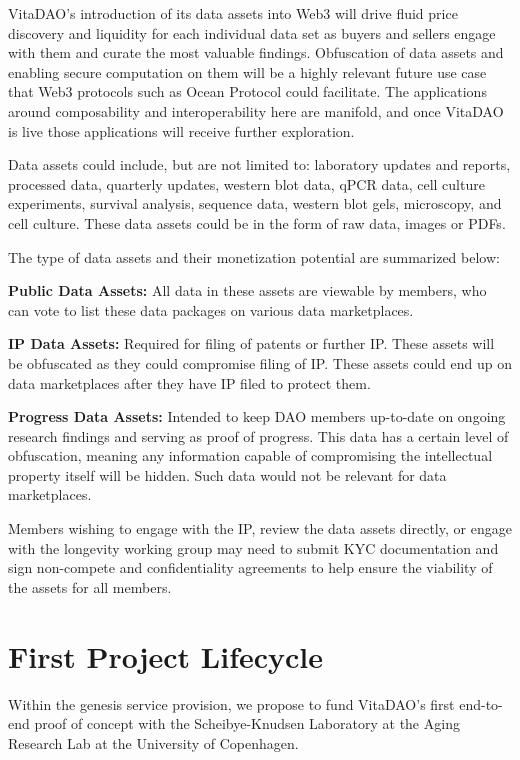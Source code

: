 \documentclass[10pt,letterpaper]{article}
\newenvironment{tight_enumerate}{
\begin{enumerate}
  \setlength{\itemsep}{0pt}
  \setlength{\parskip}{0pt}
}{\end{enumerate}}
\begin{document}
VitaDAO’s introduction of its data assets into Web3 will drive fluid price discovery and liquidity for each individual data set as buyers and sellers engage with them and curate the most valuable findings. Obfuscation of data assets and enabling secure computation on them will be a highly relevant future use case that Web3 protocols such as Ocean Protocol could facilitate. The applications around composability and interoperability here are manifold, and once VitaDAO is live those applications will receive further exploration. 

Data assets could include, but are not limited to: laboratory updates and reports, processed data, quarterly updates, western blot data, qPCR data, cell culture experiments, survival analysis, sequence data, western blot gels, microscopy, and cell culture. These data assets could be in the form of raw data, images or PDFs. 

The type of data assets and their monetization potential are summarized below:

\begin{tight_enumerate}
\item \textbf{Public Data Assets:} All data in these assets are viewable by members, who can vote to list these data packages on various data marketplaces.
\item \textbf{IP Data Assets:} Required for filing of patents or further IP. These assets will be obfuscated as they could compromise filing of IP. These assets could end up on data marketplaces after they have IP filed to protect them.
\item \textbf{Progress Data Assets:} Intended to keep DAO members up-to-date on ongoing research findings and serving as proof of progress. This data has a certain level of obfuscation, meaning any information capable of compromising the intellectual property itself will be hidden. Such data would not be relevant for data marketplaces.
\end{tight_enumerate}

Members wishing to engage with the IP, review the data assets directly, or engage with the longevity working group may need to submit KYC documentation and sign non-compete and confidentiality agreements to help ensure the viability of the assets for all members.

\section{First Project Lifecycle}
Within the genesis service provision, we propose to fund VitaDAO’s first end-to-end proof of concept with the Scheibye-Knudsen Laboratory at the Aging Research Lab at the University of Copenhagen.
\end{document}

